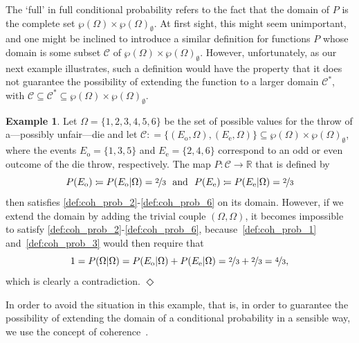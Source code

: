 \documentclass[10pt,a4paper]{paper}
\theoremstyle{definition}
\newtheorem{exmp}{Example}
\newcommand{\reals}{\mathbb{R}}
\newcommand{\paths}{\Omega}
\newcommand{\power}{\wp(\paths)}
\newcommand{\nonemptypower}{\power_{\emptyset}}
\newcommand{\coloneqq}{:\!=}
\newcommand{\exampleend}{\hfill$\Diamond$}
\begin{document}
The `full' in full conditional probability refers to the fact that the domain of $P$ is the complete set $\power\times\nonemptypower$. At first sight, this might seem unimportant, and one might be inclined to introduce a similar definition for functions $P$ whose domain is some subset $\mathcal{C}$ of $\power\times\nonemptypower$. However, unfortunately, as our next example illustrates, such a definition would have the property that it does not guarantee the possibility of extending the function to a larger domain $\mathcal{C}^*$, with $\mathcal{C}\subseteq\mathcal{C}^*\subseteq\power\times\nonemptypower$.

\begin{exmp}\label{exmp:F1F4cannotbeextended}
Let $\Omega=\{1,2,3,4,5,6\}$ be the set of possible values for the throw of a---possibly unfair---die and let $\mathcal{C}\coloneqq\{(E_{\mathrm{o}},\Omega),(E_{\mathrm{e}},\Omega)\}\subseteq\power\times\nonemptypower$, where the events $E_{\mathrm{o}}=\{1,3,5\}$ and $E_{\mathrm{e}}=\{2,4,6\}$ correspond to an odd or even outcome of the die throw, respectively. The map $P\colon\mathcal{C}\to\reals$ that is defined by
\begin{equation*}
P(E_{\mathrm{o}})\coloneqq P(E_{\mathrm{o}}\vert\Omega)=\nicefrac{2}{3}
~\text{ and }~
P(E_{\mathrm{e}})\coloneqq P(E_{\mathrm{e}}\vert\Omega)=\nicefrac{2}{3}
\end{equation*}
then satisfies \ref{def:coh_prob_2}-\ref{def:coh_prob_6} on its domain. However, if we extend the domain by adding the trivial couple $(\Omega,\Omega)$, it becomes impossible to satisfy \ref{def:coh_prob_2}-\ref{def:coh_prob_6}, because~\ref{def:coh_prob_1} and~\ref{def:coh_prob_3} would then require that
\begin{equation*}
1=P(\Omega\vert\Omega)=P(E_{\mathrm{o}}\vert\Omega)+P(E_{\mathrm{e}}\vert\Omega)=\nicefrac{2}{3}+\nicefrac{2}{3}=\nicefrac{4}{3},
\end{equation*}
which is clearly a contradiction.
\exampleend
\end{exmp}

In order to avoid the situation in this example, that is, in order to guarantee the possibility of extending the domain of a conditional probability in a sensible way, we use the concept of coherence~\cite{berti1991coherent,DeFinetti:oT_PWtAE,regazzini1985finitely,williams1975,Williams:2007eu}.
\end{document}
